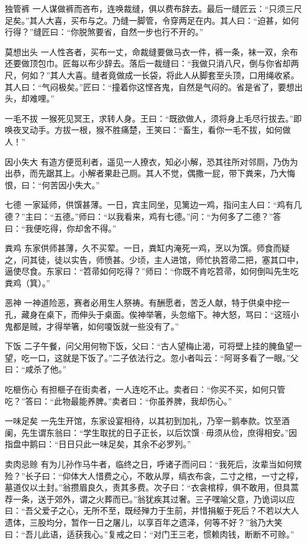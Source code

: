 \documentclass[12pt,UTF8]{ctexbook}
\begin{document}
独管裤
一人谋做裤而吝布，连唤裁缝，俱以费布辞去。最后一缝匠云：“只须三尺足矣。”其人大喜，买布与之。乃缝一脚管，令穿两足在内。其人曰：“迫甚，如何行得？”缝匠曰：“你脱煞要省，自然一步也行不开的。”

莫想出头
一人性吝者，买布一丈，命裁缝要做马衣一件，裤一条，袜一双，余布还要做顶包巾。匠每以布少辞去。落后一裁缝曰：“我做只消八尺，倒与你省却两尺，何如？”其人大喜。缝者竟做成一长袋，将此人从脚套至头顶，口用绳收紧。其人曰：“气闷极矣。”匠曰：“撞着你这悭吝鬼，自然是气闷的。省是省了，要想出头，却难哩。”

一毛不拔
一猴死见冥王，求转人身。王曰：“既欲做人，须将身上毛尽行拔去。”即唤夜叉动手。方拔一根，猴不胜痛楚，王笑曰：“畜生，看你一毛不拔，如何做人！”

因小失大
有造方便觅利者，遥见一人撩衣，知必小解，恐其往所对邻厕，乃伪为出恭，而先踞其上。小解者果赴己厕。其人不觉，偶撒一屁，带下粪来，乃大悔恨，曰：“何苦因小失大。”

七德
一家延师，供馔甚薄。一日，宾主同坐，见篱边一鸡，指问主人曰：“鸡有几德？”主曰：“五德。”师曰：“以我看来，鸡有七德。”问：“为何多了二德？”答曰：“我便吃得，你却舍不得。”

粪鸡
东家供师甚薄，久不买荤。一日，粪缸内淹死一鸡，烹以为馔。师食而疑之，问其徒，徒以实告，师愤甚。少顷，主人进馆，师忙执笤帚二把，塞其口中，逼使尽食。东家曰：“笤帚如何吃得？”师曰：“你既不肯吃笤帚，如何倒叫先生吃粪鸡（箕）。”

恶神
一神道险恶，赛者必用生人祭祷。有酬愿者，苦乏人献，特于供桌中挖一孔，藏身在桌下，而伸头于桌面。俟神举箸，头忽缩下。神大怒，骂曰：“这班小鬼都是贼，才得举箸，如何嗄饭就一些没有了。”

下饭
二子午餐，问父用何物下饭，父曰：“古人望梅止渴，可将壁上挂的腌鱼望一望，吃一口，这就是下饭了。”二子依法行之。忽小者叫云：“阿哥多看了一眼。”父曰：“咸杀了他。”

吃榧伤心
有担榧子在街卖者，一人连吃不止。卖者曰：“你买不买，如何只管吃？”答曰：“此物最能养脾。”卖者曰：“你虽养脾，我却伤心。”

一味足矣
一先生开馆，东家设宴相待，以其初到加礼，乃宰一鹅奉款。饮至酒阑，先生谓东翁曰：“学生取扰的日子正长，以后饮馔·毋须从俭，庶得相安。”因指盘中鹅曰：“日日只此一味足矣，其余不必罗列。”

卖肉忌赊
有为儿孙作马牛者，临终之日，呼诸子而问曰：“我死后，汝辈当如何殡殓？”长子曰：“仰体大人惜费之心，不敢从厚，缟衣布衾，二寸之棺，一寸之椁，墓道仅以土封。”翁攒眉良久，责其多费。次子曰：“衣衾棺椁，俱不敢用，但具蒿荐一条，送于郊外，谓之火葬而已。”翁犹疾其过奢。三子嘿喻父意，乃诡词以应曰：“吾父爱子之心，无所不至，既经殚力于生前，并惜捐躯于死后？不若以大人遗体，三股均分，暂作一日之屠儿，以享百年之遗泽，何等不好？”翁乃大笑曰：“吾儿此语，适获我心。”复戒之曰：“对门王三老，惯赖肉钱，断断不可赊。”
\end{document}
